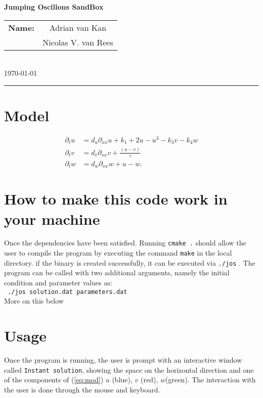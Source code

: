 \documentclass{article}
\begin{document}
\begin{center}
  {\Large \textbf{Jumping Oscillons SandBox}}
\end{center}
\begin{flushright}
  \begin{tabular}{cc}
    \textbf{Name:}&Adrian van Kan\\
    &Nicolas V. van Rees
  \end{tabular}\\
  \tiny{\today}
  \end{flushright}
  \hrule
\section{Model}
\begin{align}
  \label{eq:mod}
\partial_t u&=d_u\partial_{xx} u +k_1+2u-u^3-k_3v-k_4w\\
\partial_tv&=d_v\partial_{xx} v+\frac{(u-v)}{\tau} \nonumber\\
\partial_tw&=d_w\partial_{xx}w+u-w.\nonumber
\end{align}
\section{How to make this code work in your machine}
Once the dependencies have been satisfied. Running \verb!cmake .!
should allow the user to compile the program by executing the
command \verb!make! in the local directory. if the binary is created
successfully, it can be executed via \verb!./jos! . The program can be
called with two additional arguments, namely the initial condition and
parameter values as:\\
\verb! ./jos solution.dat parameters.dat!\\
More on this below
\section{Usage}
Once the program is running, the user is prompt with an interactive
window called \verb!Instant solution!, showing the space on the
horizontal direction and one of the components of (\ref{eq:mod}) $u$ (blue), $v$ (red),
$w$(green).  The interaction with the user is done through the mouse
and keyboard.
\end{document}
